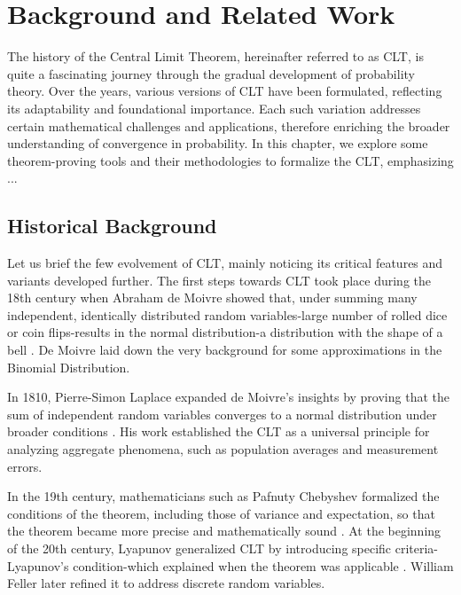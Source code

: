 \chapter[Background and Related Work]{Background and Related Work}
\label{chap:2}

The history of the Central Limit Theorem, hereinafter referred to as CLT, is quite a fascinating journey through the gradual development of probability theory. Over the years, various versions of CLT have been formulated, reflecting its adaptability and foundational importance. Each such variation addresses certain mathematical challenges and applications, therefore enriching the broader understanding of convergence in probability. In this chapter, we explore some theorem-proving tools and their methodologies to formalize the CLT, emphasizing ...

\section{Historical Background}
Let us brief the few evolvement of CLT, mainly noticing its critical features and variants developed further. The first steps towards CLT took place during the 18th century when Abraham de Moivre showed that, under summing many independent, identically distributed random variables-large number of rolled dice or coin flips-results in the normal distribution-a distribution with the shape of a bell \cite{de1733approximatio}. De Moivre laid down the very background for some approximations in the Binomial Distribution.

In 1810, Pierre-Simon Laplace expanded de Moivre’s insights by proving that the sum of independent random variables converges to a normal distribution under broader conditions \cite{laplace1835oeuvres}. His work established the CLT as a universal principle for analyzing aggregate phenomena, such as population averages and measurement errors.

In the 19th century, mathematicians such as Pafnuty Chebyshev formalized the conditions of the theorem, including those of variance and expectation, so that the theorem became more precise and mathematically sound \cite{chebyshev1890deux}. At the beginning of the 20th century, Lyapunov generalized CLT by introducing specific criteria-Lyapunov's condition-which explained when the theorem was applicable \cite{lyapunov1895pafnutii}. William Feller \cite{feller1945} later refined it to address discrete random variables.

